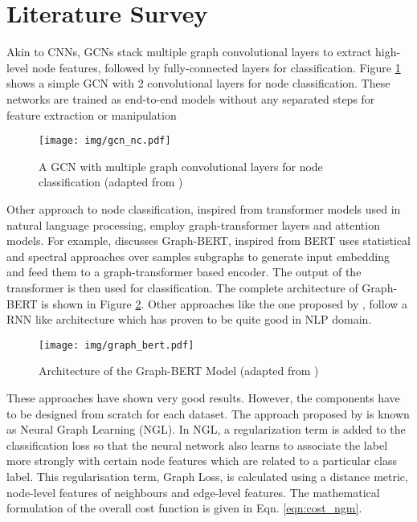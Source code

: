 \documentclass{article}
\begin{document}
\section{Literature Survey}

Akin to CNNs, GCNs stack multiple graph convolutional layers to extract high-level node features, followed by fully-connected layers for classification. Figure \ref{fig:gcn_nc} shows a simple GCN with 2 convolutional layers for node classification. These networks are trained as end-to-end models without any separated steps for feature extraction or manipulation

\begin{figure}[h]
    \centering
    \texttt{[image: img/gcn\_nc.pdf]}
    \caption{A GCN with multiple graph convolutional layers for node classification (adapted from \cite{9046288})}
    \label{fig:gcn_nc}
\end{figure}

Other approach to node classification, inspired from transformer models used in natural language processing, employ graph-transformer layers and attention models. For example, \citet{zhang2020graphbert} discusses Graph-BERT, inspired from BERT uses statistical and spectral approaches over samples subgraphs to generate input embedding and feed them to a graph-transformer based encoder. The output of the transformer is then used for classification. The complete architecture of Graph-BERT is shown in Figure \ref{fig:graph_bert}. Other approaches like the one proposed by \citet{sun2019adagcn}, follow a RNN like architecture which has proven to be quite good in NLP domain.

\begin{figure}[h]
    \centering
    \texttt{[image: img/graph\_bert.pdf]}
    \caption{Architecture of the Graph-BERT Model (adapted from \cite{zhang2020graphbert})}
    \label{fig:graph_bert}
\end{figure}

These approaches have shown very good results. However, the components have to be designed from scratch for each dataset. The approach proposed by \citet{10.1145/3159652.3159731} is known as Neural Graph Learning (NGL). In NGL, a regularization term is added to the classification loss so that the neural network also learns to associate the label more strongly with certain node features which are related to a particular class label. This regularisation term, Graph Loss, is calculated using a distance metric, node-level features of neighbours and edge-level features. The mathematical formulation of the overall cost function is given in Eqn. \ref{eqn:cost_ngm}.
\end{document}
